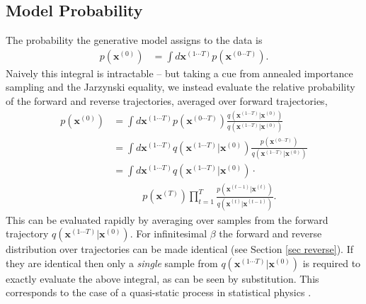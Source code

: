 \documentclass{article}
\newcommand{\mb}{\mathbf}
\newcommand{\pf}{q\left( \mb x^{(t)} | \mb x^{(t-1)} \right)}
\newcommand{\qr}{p\left( \mb x^{(t-1)} | \mb x^{(t)} \right)}
\newcommand{\qst}{p \left( \mb x^{(T)} \right)}
\newcommand{\pcondtraj}{q\left( \mb x^{(1\cdots T)} | \mb x^{(0)} \right)}
\newcommand{\qtraj}{p\left( \mb x^{(0\cdots T)} \right)}
\newcommand{\qmarg}{p\left( \mb x^{(0)} \right)}
\begin{document}
\subsection{Model Probability}
\label{sec mod prob}
The probability the generative model assigns to the data is
\begin{align}
p\left( \mb x^{(0)} \right) &= \int d\mb x^{(1\cdots T)} \qtraj
.
\end{align}
Naively this integral is intractable -- but taking a cue from annealed importance sampling and the Jarzynski equality, we instead evaluate the relative 
probability of the forward and reverse trajectories, averaged over forward trajectories,
\begin{align}
\qmarg &= \int d\mb x^{(1\cdots T)} \qtraj \frac{\pcondtraj}{\pcondtraj} \\
&= \int d\mb x^{(1\cdots T)} \pcondtraj \frac{\qtraj}{\pcondtraj} \\
&= \int d\mb x^{(1\cdots T)} \pcondtraj \cdot \nonumber \\ &\qquad \quad \qst \prod_{t=1}^T \frac{\qr}{\pf}
.
\end{align}
This can be evaluated rapidly by averaging over samples from the forward trajectory $\pcondtraj$.  For 
infinitesimal $\beta$ the forward and reverse distribution over trajectories can be made identical (see Section \ref{sec reverse}).  
If they are identical then only a {\em single} 
sample from $\pcondtraj$ is required to exactly evaluate the above integral, as can be seen by substitution.  This corresponds to the case of a 
quasi-static process in statistical 
physics \cite{spinney2013fluctuation,jarzynski2013equalities}.
\end{document}
